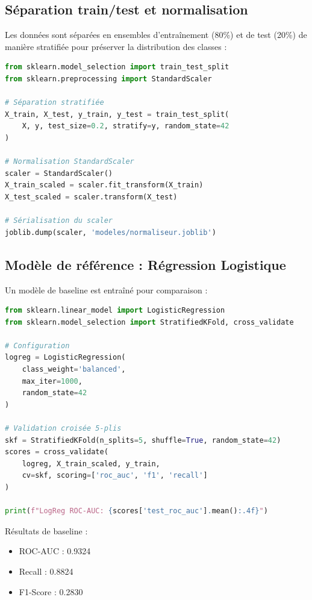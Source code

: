 \documentclass[a4paper,12pt]{report}
\begin{document}
\subsection{Séparation train/test et normalisation}

Les données sont séparées en ensembles d'entraînement (80\%) et de test (20\%) de manière stratifiée pour préserver la distribution des classes :

\begin{lstlisting}[language=Python]
from sklearn.model_selection import train_test_split
from sklearn.preprocessing import StandardScaler

# Séparation stratifiée
X_train, X_test, y_train, y_test = train_test_split(
    X, y, test_size=0.2, stratify=y, random_state=42
)

# Normalisation StandardScaler
scaler = StandardScaler()
X_train_scaled = scaler.fit_transform(X_train)
X_test_scaled = scaler.transform(X_test)

# Sérialisation du scaler
joblib.dump(scaler, 'modeles/normaliseur.joblib')
\end{lstlisting}

\subsection{Modèle de référence : Régression Logistique}

Un modèle de baseline est entraîné pour comparaison :

\begin{lstlisting}[language=Python]
from sklearn.linear_model import LogisticRegression
from sklearn.model_selection import StratifiedKFold, cross_validate

# Configuration
logreg = LogisticRegression(
    class_weight='balanced',
    max_iter=1000,
    random_state=42
)

# Validation croisée 5-plis
skf = StratifiedKFold(n_splits=5, shuffle=True, random_state=42)
scores = cross_validate(
    logreg, X_train_scaled, y_train,
    cv=skf, scoring=['roc_auc', 'f1', 'recall']
)

print(f"LogReg ROC-AUC: {scores['test_roc_auc'].mean():.4f}")
\end{lstlisting}

Résultats de baseline :
\begin{itemize}
    \item ROC-AUC : 0.9324
    \item Recall : 0.8824
    \item F1-Score : 0.2830
\end{itemize}
\end{document}
